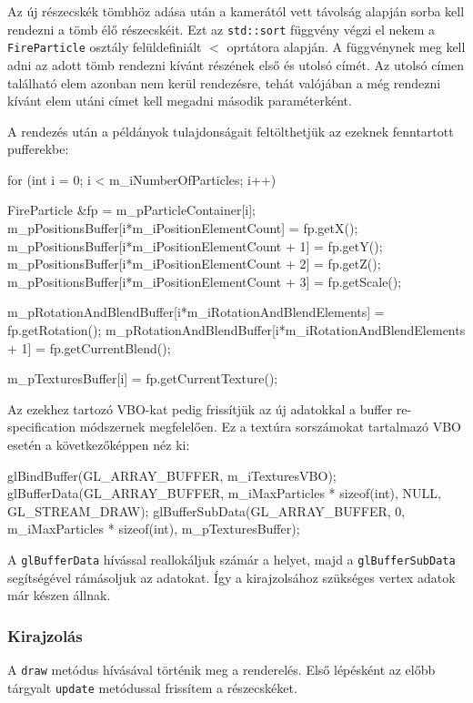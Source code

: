Az új részecskék tömbhöz adása után a kamerától vett távolság alapján sorba kell rendezni a tömb élő részecskéit. Ezt az \texttt{std::sort} függvény végzi el nekem a \texttt{FireParticle} osztály felüldefiniált $<$ oprtátora alapján. A függvénynek meg kell adni az adott tömb rendezni kívánt részének első és utolsó címét. Az utolsó címen található elem azonban nem kerül rendezésre, tehát valójában a még rendezni kívánt elem utáni címet kell megadni második paraméterként.

A rendezés után a példányok tulajdonságait feltölthetjük az ezeknek fenntartott pufferekbe:
\begin{cpp}
for (int i = 0; i < m_iNumberOfParticles; i++)
{
	FireParticle &fp = m_pParticleContainer[i];
	m_pPositionsBuffer[i*m_iPositionElementCount] = fp.getX();
	m_pPositionsBuffer[i*m_iPositionElementCount + 1] = fp.getY();
	m_pPositionsBuffer[i*m_iPositionElementCount + 2] = fp.getZ();
	m_pPositionsBuffer[i*m_iPositionElementCount + 3] = fp.getScale();

	m_pRotationAndBlendBuffer[i*m_iRotationAndBlendElements] = 
						fp.getRotation();
	m_pRotationAndBlendBuffer[i*m_iRotationAndBlendElements + 1] = 
						fp.getCurrentBlend();

	m_pTexturesBuffer[i] = fp.getCurrentTexture();
}
\end{cpp}
Az ezekhez tartozó VBO-kat pedig frissítjük az új adatokkal a buffer re-specification módszernek megfelelően. Ez a textúra sorszámokat tartalmazó VBO esetén a következőképpen néz ki:
\begin{cpp}
glBindBuffer(GL_ARRAY_BUFFER, m_iTexturesVBO);
glBufferData(GL_ARRAY_BUFFER, m_iMaxParticles * sizeof(int), 
			NULL, GL_STREAM_DRAW);
glBufferSubData(GL_ARRAY_BUFFER, 0, m_iMaxParticles * sizeof(int), 
			m_pTexturesBuffer);
\end{cpp}
A \texttt{glBufferData} hívással reallokáljuk számár a helyet, majd a \texttt{glBufferSubData} segítségével rámásoljuk az adatokat. Így a kirajzolsához szükséges vertex adatok már készen állnak.

\subsubsection{Kirajzolás}
A \texttt{draw} metódus hívásával történik meg a renderelés. Első lépésként az előbb tárgyalt \texttt{update} metódussal frissítem a részecskéket. 

